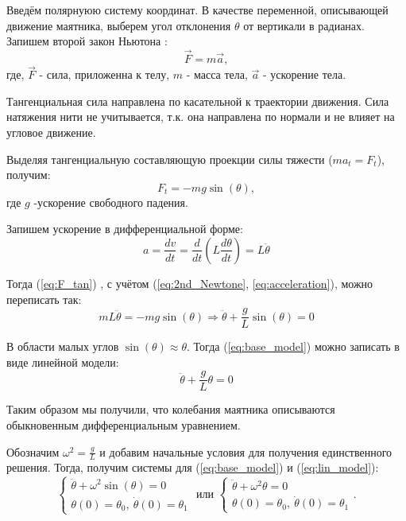 Введём полярнуюю систему координат. В качестве переменной, описывающей движение маятника, выберем угол отклонения $\theta$ от вертикали в радианах. Запишем второй закон Ньютона \cite{feinman}:
\begin{equation}
	\overrightarrow{F} = m \overrightarrow{a},
	\label{eq:2nd_Newtone}
\end{equation}
где, $\overrightarrow{F}$ - сила, приложенна к телу, $m$ - масса тела, $\overrightarrow{a}$ - ускорение тела.

Тангенциальная сила направлена по касательной к траектории движения. Сила натяжения нити не учитывается, т.к. она направлена по нормали  и не влияет на угловое движение.

Выделяя тангенциальную составляющую \cite{feinman} проекции силы тяжести ($ma_t = F_t$), получим:
\begin{equation}
	F_t = - mg\sin(\theta),
	\label{eq:F_tan}
\end{equation}
где $g$ -ускорение свободного падения.

Запишем ускорение в дифференциальной форме:
\begin{equation}
	a = \frac{dv}{dt} = \frac{d}{dt}\left(L\frac{d\theta}{dt}\right) = L \ddot{\theta}
	\label{eq:acceleration}
\end{equation}

Тогда (\ref{eq:F_tan}) , с учётом (\ref{eq:2nd_Newtone}, \ref{eq:acceleration}), можно переписать так:
\begin{equation}
	mL\ddot{\theta} = -mg\sin(\theta) \Rightarrow \ddot{\theta} +\frac{g}{L}\sin(\theta) = 0 
	\label{eq:base_model}
\end{equation}

В области малых углов $\sin(\theta) \approx \theta$.
Тогда (\ref{eq:base_model}) можно записать в виде линейной модели:
\begin{equation}
	\ddot{\theta} +\frac{g}{L}\theta = 0
	\label{eq:lin_model}
\end{equation}

Таким образом мы получили, что колебания маятника описываются обыкновенным дифференциальным уравнением. 

Обозначим $\omega^2 = \frac{g}{L}$ и добавим начальные условия для получения единственного решения. Тогда, получим системы для (\ref{eq:base_model}) и (\ref{eq:lin_model}):
\begin{equation}
	\begin{cases}
		\ddot{\theta} + \omega^2 \sin(\theta) = 0 \\
		\theta(0) = \theta_0, \ \dot{\theta}(0) = \theta_1
	\end{cases}
	\text{ или }
	\begin{cases}
		\ddot{\theta} + \omega^2 \theta = 0 \\
		\theta(0) = \theta_0, \ \dot{\theta}(0) = \theta_1
	\end{cases}.
\end{equation}

